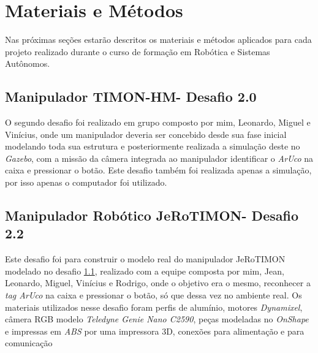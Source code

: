 \chapter{Materiais e Métodos}
\label{chap:mat}
Nas próximas seções estarão descritos os materiais e métodos aplicados para cada projeto realizado durante o curso de formação em Robótica e Sistemas Autônomos. 


\section{Manipulador TIMON-HM- Desafio 2.0}
\label{sec:met_desafio2}
O segundo desafio foi realizado em grupo composto por mim, Leonardo, Miguel e Vinícius, onde um manipulador deveria ser concebido desde sua fase inicial modelando toda sua estrutura e posteriormente realizada a simulação deste no \textit{Gazebo}, com a missão da câmera integrada ao manipulador identificar o \textit{ArUco} na caixa e pressionar o botão. Este desafio também foi realizada apenas a simulação, por isso apenas o computador foi utilizado.  

\section{Manipulador Robótico JeRoTIMON- Desafio 2.2 }
\label{sec:met_desafio2_2}
Este desafio foi para construir o modelo real do manipulador JeRoTIMON modelado no desafio \ref{sec:met_desafio2}, realizado com a equipe composta por mim, Jean, Leonardo, Miguel, Vinícius e Rodrigo, onde o objetivo era o mesmo, reconhecer a \textit{tag ArUco} na caixa e pressionar o botão, só que dessa vez no ambiente real. Os materiais utilizados nesse desafio foram perfis de alumínio, motores \textit{Dynamixel}, câmera RGB modelo \textit{Teledyne Genie Nano C2590},  peças modeladas no \textit{OnShape} e impressas em \textit{ABS} por uma impressora 3D, conexões para alimentação e para comunicação

